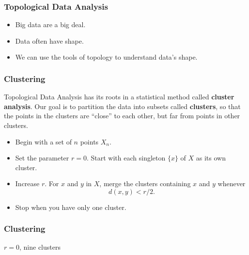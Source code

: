 
\begin{frame}
\frametitle{Topological Data Analysis}
\begin{itemize}
	\item<1-> Big data are a big deal.
	\item<2-> Data often have shape.
	\item<3-> We can use the tools of topology to understand data's shape.
\end{itemize}
\end{frame}

\begin{frame}
\frametitle{Clustering}
Topological Data Analysis has its roots in a statistical method called \textbf{cluster analysis}. Our goal is to partition the data into subsets called \textbf{clusters}, so that the points in the clusters are ``close'' to each other, but far from points in other clusters. 
\begin{itemize}
	\item<1-> Begin with a set of $n$ points $X_n$.
	\item<2-> Set the parameter $r=0$. Start with each singleton $\{x\}$ of $X$ as its own cluster.
	\item<3-> Increase $r$. For $x$ and $y$ in $X$, merge the clusters containing $x$ and $y$ whenever
	\[
	d(x,y) <r/2.
	\]
	\item<5-> Stop when you have only one cluster.
\end{itemize}
\end{frame}
\begin{frame}
\frametitle{Clustering}
\begin{center}
\end{center}
$r=0$, \quad nine clusters
\end{frame}
